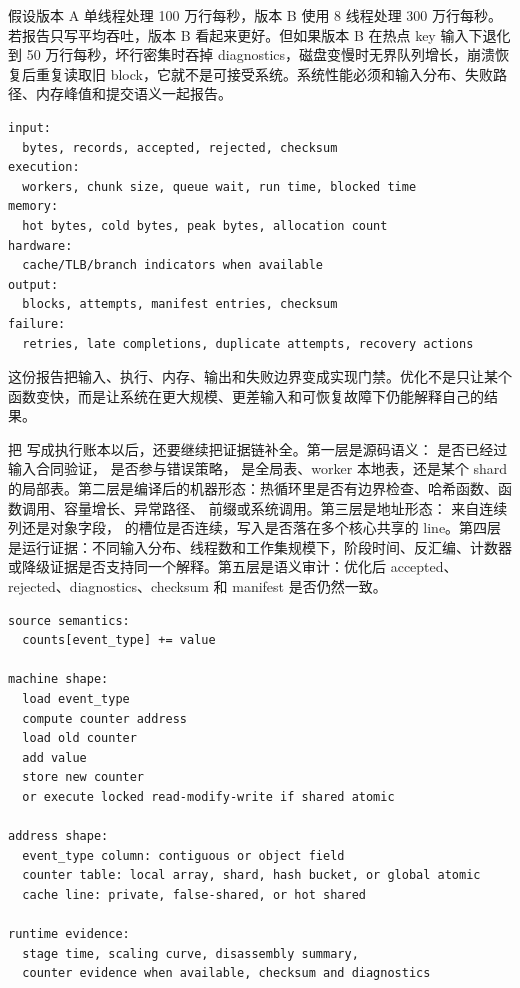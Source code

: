 假设版本 A 单线程处理 100 万行每秒，版本 B 使用 8 线程处理 300 万行每秒。若报告只写平均吞吐，版本 B 看起来更好。但如果版本 B 在热点 key 输入下退化到 50 万行每秒，坏行密集时吞掉 diagnostics，磁盘变慢时无界队列增长，崩溃恢复后重复读取旧 block，它就不是可接受系统。系统性能必须和输入分布、失败路径、内存峰值和提交语义一起报告。

\begin{lstlisting}[numbers=none,caption={一次运行报告至少应回答的问题}]
input:
  bytes, records, accepted, rejected, checksum
execution:
  workers, chunk size, queue wait, run time, blocked time
memory:
  hot bytes, cold bytes, peak bytes, allocation count
hardware:
  cache/TLB/branch indicators when available
output:
  blocks, attempts, manifest entries, checksum
failure:
  retries, late completions, duplicate attempts, recovery actions
\end{lstlisting}

这份报告把输入、执行、内存、输出和失败边界变成实现门禁。优化不是只让某个函数变快，而是让系统在更大规模、更差输入和可恢复故障下仍能解释自己的结果。

把  写成执行账本以后，还要继续把证据链补全。第一层是源码语义： 是否已经过输入合同验证， 是否参与错误策略， 是全局表、worker 本地表，还是某个 shard 的局部表。第二层是编译后的机器形态：热循环里是否有边界检查、哈希函数、函数调用、容量增长、异常路径、 前缀或系统调用。第三层是地址形态： 来自连续列还是对象字段， 的槽位是否连续，写入是否落在多个核心共享的 line。第四层是运行证据：不同输入分布、线程数和工作集规模下，阶段时间、反汇编、计数器或降级证据是否支持同一个解释。第五层是语义审计：优化后 accepted、rejected、diagnostics、checksum 和 manifest 是否仍然一致。

\begin{lstlisting}[numbers=none,caption={从一行更新到证据链的展开}]
source semantics:
  counts[event_type] += value

machine shape:
  load event_type
  compute counter address
  load old counter
  add value
  store new counter
  or execute locked read-modify-write if shared atomic

address shape:
  event_type column: contiguous or object field
  counter table: local array, shard, hash bucket, or global atomic
  cache line: private, false-shared, or hot shared

runtime evidence:
  stage time, scaling curve, disassembly summary,
  counter evidence when available, checksum and diagnostics
\end{lstlisting}

